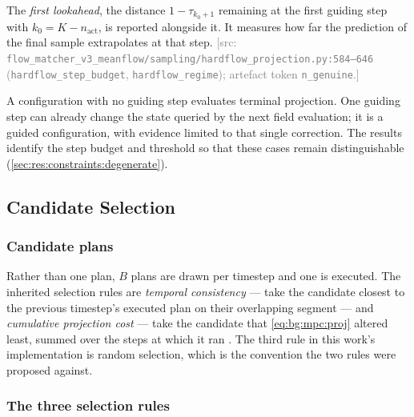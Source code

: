 \documentclass[headsepline,footsepline,footinclude=false,oneside,fontsize=11pt,paper=a4,listof=totoc,bibliography=totoc]{scrbook}
\theoremstyle{definition}
\theoremstyle{plain}
\theoremstyle{remark}
\newcommand{\sidx}[1]{_{\textrm{#1}}}
\newcommand{\ftime}{\tau}                      %
\newcommand{\nfe}{K}                           %
\newif\ifsubmission
\newcommand{\srcnote}[1]{\ifsubmission\else\textcolor{gray}{\footnotesize\textsf{[src: #1]}}\fi}
\begin{document}
The \emph{first lookahead}, the distance $1-\ftime_{k_{0}+1}$ remaining at the first guiding step with
$k_{0} = \nfe - n\sidx{act}$, is reported alongside it. It measures how far the prediction of the final
sample extrapolates at that step.
\srcnote{\texttt{flow\_matcher\_v3\_meanflow/sampling/hardflow\_projection.py:584--646}
(\texttt{hardflow\_step\_budget}, \texttt{hardflow\_regime}); artefact token \texttt{n\_genuine}.}

A configuration with no guiding step evaluates terminal projection. One guiding step can already
change the state queried by the next field evaluation; it is a guided configuration, with evidence
limited to that single correction. The results identify the step budget and threshold so that these
cases remain distinguishable (\autoref{sec:res:constraints:degenerate}).

\subsection{Candidate Selection}\label{sec:method:selection}

\subsubsection*{Candidate plans}

Rather than one plan, $B$ plans are drawn per timestep and one is executed. The inherited
selection rules are \emph{temporal consistency} --- take the candidate closest to the previous
timestep's executed plan on their overlapping segment --- and \emph{cumulative projection
cost} --- take the candidate that \eqref{eq:bg:mpc:proj} altered least, summed over the steps
at which it ran \parencite[Sec.~5.4]{romer2025diffusion}. The third rule in this work's implementation is random selection,
which is the convention the two rules were proposed against.

\subsubsection*{The three selection rules}
\end{document}
